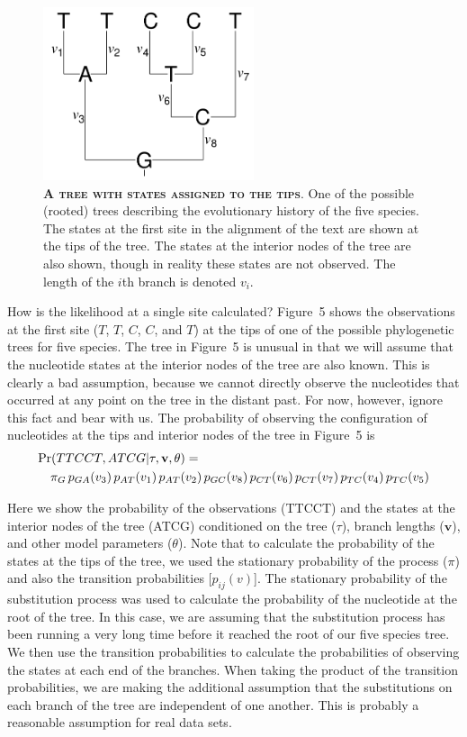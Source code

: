 \documentclass{svmult}
\begin{document}
\begin{figure}[t]
\centering
\includegraphics[height=2in]{fig5}
\caption{\textbf{\textsc{A tree with states assigned to the tips}}.
One of the possible (rooted) trees describing the evolutionary history of the five species. The
states at the first site in the alignment of the text are shown at the tips of the tree. The
states at the interior nodes of the tree are also shown, though in reality these states are not
observed. The length of the $i$th branch is denoted $v_i$. }
\label{fig5}
\end{figure}

How is the likelihood at a single site calculated? Figure~5 shows the observations at the first
site ($T$, $T$, $C$, $C$, and $T$) at the tips of one of the possible phylogenetic trees for five
species. The tree in Figure~5 is unusual in that we will assume that the nucleotide states at the
interior nodes of the tree are also known. This is clearly a bad assumption, because we cannot
directly observe the nucleotides that occurred at any point on the tree in the distant past. For
now, however, ignore this fact and bear with us. The probability of observing the configuration of
nucleotides at the tips and interior nodes of the tree in Figure~5 is
\begin{eqnarray*}
\lefteqn{\Pr(TTCCT , ATCG | \tau, {\mathbf v}, \theta ) =} \\
& & \pi_G \,
p_{GA}(v_3) \,
p_{AT}(v_1) \,
p_{AT}(v_2) \,
p_{GC}(v_8) \,
p_{CT}(v_6) \,
p_{CT}(v_7) \,
p_{TC}(v_4) \,
p_{TC}(v_5)
\end{eqnarray*}

Here we show the probability of the observations (TTCCT) and the states at the interior nodes of
the tree (ATCG) conditioned on the tree ($\tau$), branch lengths (${\mathbf v}$), and other model
parameters  ($\theta$).  Note that to calculate the probability of the states at the tips of the
tree, we used the stationary probability of the process ($\pi$) and also the transition
probabilities [$p_{ij}(v)$]. The stationary probability of the substitution process was used to
calculate the probability of the nucleotide at the root of the tree. In this case, we are assuming
that the substitution process has been running a very long time before it reached the root of our
five species tree. We then use the transition probabilities to calculate the probabilities of
observing the states at each end of the branches. When taking the product of the transition
probabilities, we are making the additional assumption that the substitutions on each branch of the
tree are independent of one another. This is probably a reasonable assumption for real data sets.
\end{document}
